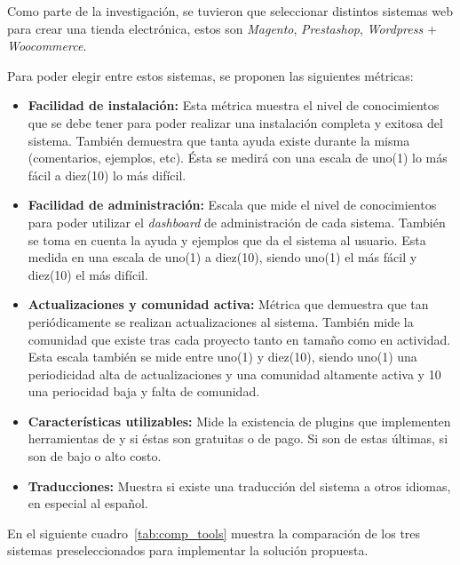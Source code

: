 Como parte de la investigación, se tuvieron que seleccionar distintos sistemas web para
crear una tienda electrónica, estos son \emph{Magento}, \emph{Prestashop}, \emph{Wordpress
$+$ Woocommerce}.

Para poder elegir entre estos sistemas, se proponen las siguientes métricas:

\begin{itemize}

    \item {\bf Facilidad de instalación:}
        Esta métrica muestra el nivel de conocimientos que se debe
        tener para poder realizar una instalación completa y exitosa del sistema.
        También demuestra que tanta ayuda existe durante la misma (comentarios,
        ejemplos, etc).
        Ésta se medirá con una escala de uno(1) lo más fácil a diez(10) lo más difícil.

    \item {\bf Facilidad de administración:}
        Escala que mide el nivel de conocimientos para poder utilizar el
        \emph{dashboard} de administración de cada sistema.
        También se toma en cuenta la ayuda y ejemplos que da el sistema al usuario.
        Esta medida en una escala de uno(1) a diez(10), siendo uno(1) el más fácil y diez(10) 
	el más difícil.

    \item {\bf Actualizaciones y comunidad activa:}
        Métrica que demuestra que tan periódicamente se realizan actualizaciones
        al sistema.
        También mide la comunidad que existe tras cada proyecto tanto en tamaño
        como en actividad.
        Esta escala también se mide entre uno(1) y diez(10), siendo uno(1) una periodicidad 
	alta de actualizaciones y una comunidad altamente activa
	y 10 una periocidad baja y falta de comunidad.

    \item {\bf Características utilizables:}
        Mide la existencia de plugins que implementen herramientas de {\GAM}
        y si éstas son gratuitas o de pago.
        Si son de estas últimas, si son de bajo o alto costo.

    \item {\bf Traducciones:}
        Muestra si existe una traducción del sistema a otros idiomas, en especial
        al español.

\end{itemize}

En el siguiente cuadro~\ref{tab:comp_tools} muestra la comparación de los tres
sistemas preseleccionados para implementar la solución propuesta.


